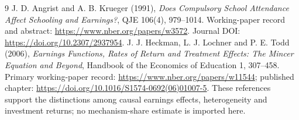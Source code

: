 \documentclass[11pt,a4paper]{article}
\begin{document}
\begin{thebibliography}{9}
 J. D. Angrist and A. B. Krueger (1991), \emph{Does Compulsory School Attendance Affect Schooling and Earnings?}, QJE 106(4), 979--1014. Working-paper record and abstract: \url{https://www.nber.org/papers/w3572}. Journal DOI: \url{https://doi.org/10.2307/2937954}.
 J. J. Heckman, L. J. Lochner and P. E. Todd (2006), \emph{Earnings Functions, Rates of Return and Treatment Effects: The Mincer Equation and Beyond}, Handbook of the Economics of Education 1, 307--458. Primary working-paper record: \url{https://www.nber.org/papers/w11544}; published chapter: \url{https://doi.org/10.1016/S1574-0692(06)01007-5}. These references support the distinctions among causal earnings effects, heterogeneity and investment returns; no mechanism-share estimate is imported here.
\end{thebibliography}
\end{document}
